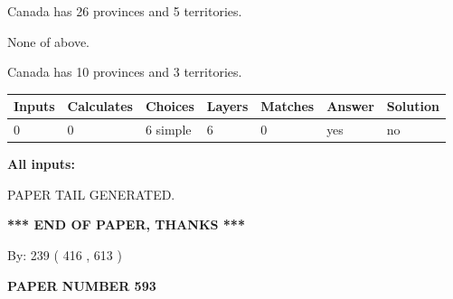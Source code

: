\documentclass[12pt]{article}
\begin{document}
 
Canada has  26 provinces and  5 territories.
 
 
 None of above.
 
 
\noindent{}
 
 
Canada has 10  provinces and 3 territories.
 
 
\noindent{}
 
 
   
   
   
   
\noindent\begin{tabular}{|l|l|l|l|l|l|l|}
 \hline
Inputs & Calculates & Choices & Layers & Matches & Answer & Solution \\ \hline
 0  & 
 0  & 
 6
  simple  
  & 
 6  & 
 0  & 
  yes & 
  no 
  \\ \hline
 \end{tabular}
   
   
   
   
\noindent{}
   
   
   
   
\noindent\vspace{0.1in}\hspace{-0.08in} {\textbf{\Large{All inputs: }}}
   
   
   
   
   
   
 \vspace{0.2in}
 
   
   
\vspace{2.0in} PAPER TAIL GENERATED.
   
   
   
   
\vspace{1.0in} 
{\textbf{\large{ *** END OF PAPER, THANKS *** }}} 
   
   
\hspace{1.0in} By: 
 239 ( 416 ,  613 )
   
   
   
   
\newpage 
\setcounter{page}{ 
   593001 } 
   
   
   
   
 {\textbf{ \Large{ PAPER NUMBER  593  }}}
   
\end{document}
